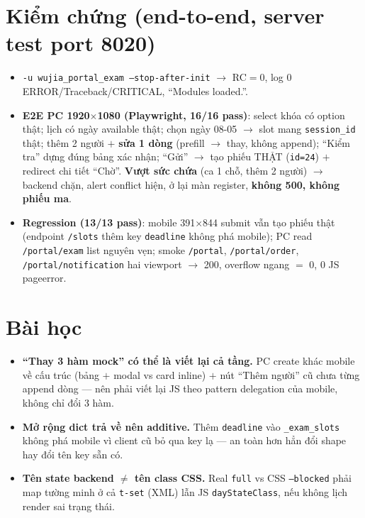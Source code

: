 \section{Kiểm chứng (end-to-end, server test port 8020)}

\begin{itemize}
  \item \texttt{-u wujia\_portal\_exam --stop-after-init} $\rightarrow$ RC$=$0, log 0
    ERROR/Traceback/CRITICAL, ``Modules loaded.''.
  \item \textbf{E2E PC 1920$\times$1080 (Playwright, 16/16 pass)}: select khóa có option
    thật; lịch có ngày available thật; chọn ngày 08-05 $\rightarrow$ slot mang
    \texttt{session\_id} thật; thêm 2 người $+$ \textbf{sửa 1 dòng} (prefill $\rightarrow$
    thay, không append); ``Kiểm tra'' dựng đúng bảng xác nhận; ``Gửi'' $\rightarrow$ tạo
    phiếu THẬT (\texttt{id=24}) $+$ redirect chi tiết ``Chờ''. \textbf{Vượt sức chứa}
    (ca 1 chỗ, thêm 2 người) $\rightarrow$ backend chặn, alert conflict hiện, ở lại màn
    register, \textbf{không 500, không phiếu ma}.
  \item \textbf{Regression (13/13 pass)}: mobile 391$\times$844 submit vẫn tạo phiếu thật
    (endpoint \texttt{/slots} thêm key \texttt{deadline} không phá mobile); PC read
    \texttt{/portal/exam} list nguyên vẹn; smoke \texttt{/portal}, \texttt{/portal/order},
    \texttt{/portal/notification} hai viewport $\rightarrow$ 200, overflow ngang $=$ 0, 0
    JS pageerror.
\end{itemize}

\section{Bài học}

\begin{itemize}
  \item \textbf{``Thay 3 hàm mock'' có thể là viết lại cả tầng.} PC create khác mobile về
    cấu trúc (bảng $+$ modal vs card inline) $+$ nút ``Thêm người'' cũ chưa từng append
    dòng --- nên phải viết lại JS theo pattern delegation của mobile, không chỉ đổi 3 hàm.
  \item \textbf{Mở rộng dict trả về nên additive.} Thêm \texttt{deadline} vào
    \texttt{\_exam\_slots} không phá mobile vì client cũ bỏ qua key lạ --- an toàn hơn hẳn
    đổi shape hay đổi tên key sẵn có.
  \item \textbf{Tên state backend $\neq$ tên class CSS.} Real \texttt{full} vs CSS
    \texttt{--blocked} phải map tường minh ở cả \texttt{t-set} (XML) lẫn JS
    \texttt{dayStateClass}, nếu không lịch render sai trạng thái.
\end{itemize}
